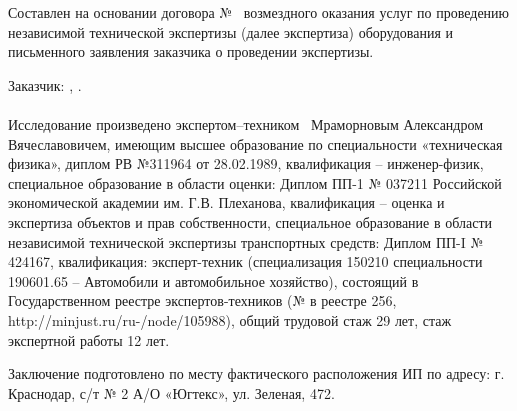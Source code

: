 \vspace{2mm}
\noindent %
Составлен на основании	договора № \NomerDoc\, возмездного оказания услуг   по проведению независимой технической экспертизы (далее экспертиза)  оборудования и письменного заявления заказчика о проведении экспертизы.

\noindent Заказчик: , . 




\paragraph*{}
Исследование произведено  экспертом--техником
\,  Мраморновым Александром Вячеславовичем, имеющим высшее  образование по специальности «техническая физика», диплом РВ №311964 от 28.02.1989, квалификация -- инженер-физик, специальное образование в области оценки: Диплом ПП-1 № 037211 Российской экономической академии им. Г.В. Плеханова, квалификация -- оценка и экспертиза объектов и прав собственности, специальное образование в области независимой технической экспертизы транспортных средств: Диплом ПП-I № 424167, квалификация: эксперт-техник (специализация 150210 специальности 190601.65 – Автомобили и автомобильное хозяйство), состоящий в Государственном реестре экспертов-техников (№ в реестре 256, http://minjust.ru/ru-/node/105988),  общий трудовой  стаж 29 лет, стаж  экспертной работы  12 лет. 
\par Заключение подготовлено по месту фактического расположения ИП по адресу: г. Краснодар, с/т № 2 А/О «Югтекс», ул. Зеленая, 472.
\vspace{4mm}
